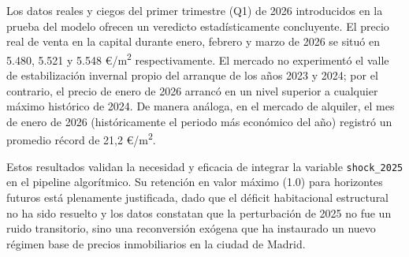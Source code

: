 \documentclass[a4paper,11pt,openany]{book}
\begin{document}
Los datos reales y ciegos del primer trimestre (Q1) de 2026 introducidos en la prueba del modelo ofrecen un veredicto estadísticamente concluyente. El precio real de venta en la capital durante enero, febrero y marzo de 2026 se situó en 5.480, 5.521 y 5.548 €/m\textsuperscript{2} respectivamente. El mercado no experimentó el valle de estabilización invernal propio del arranque de los años 2023 y 2024; por el contrario, el precio de enero de 2026 arrancó en un nivel superior a cualquier máximo histórico de 2024. De manera análoga, en el mercado de alquiler, el mes de enero de 2026 (históricamente el periodo más económico del año) registró un promedio récord de 21,2 €/m\textsuperscript{2}.

Estos resultados validan la necesidad y eficacia de integrar la variable \texttt{shock\_2025} en el pipeline algorítmico. Su retención en valor máximo (1.0) para horizontes futuros está plenamente justificada, dado que el déficit habitacional estructural no ha sido resuelto y los datos constatan que la perturbación de 2025 no fue un ruido transitorio, sino una reconversión exógena que ha instaurado un nuevo régimen base de precios inmobiliarios en la ciudad de Madrid.
\end{document}
